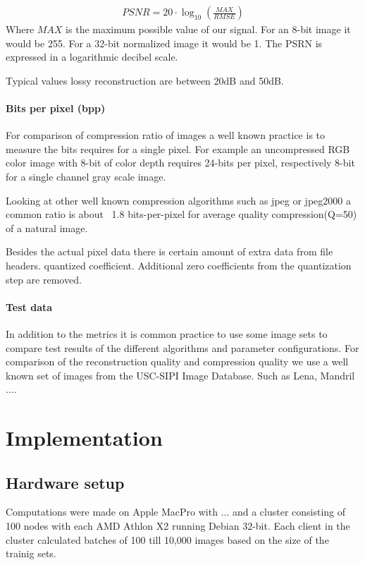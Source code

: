 
\begin{align}
 PSNR = 20 \cdot \log_{10} \left(\frac{MAX}{RMSE}\right)
\end{align}
Where $MAX$ is the maximum possible value of our signal. For an 8-bit image it
would be 255. For a 32-bit normalized image it would be 1. The PSRN is expressed
in a logarithmic decibel scale.

Typical values lossy reconstruction are between 20dB and 50dB.




\paragraph{Bits per pixel (bpp)}
For comparison of compression ratio of images a well known practice is to
measure the bits requires for a single pixel. For example an uncompressed RGB
color image with 8-bit of color depth requires 24-bits per pixel, respectively
8-bit for a single channel gray scale image.

Looking at other well known compression algorithms such as jpeg or jpeg2000
a common ratio is about ~1.8 bits-per-pixel for average quality
compression(Q=50) of a natural image. 

Besides the actual pixel data there is certain amount of extra data from file
headers. 
quantized coefficient. Additional zero coefficients from the quantization step
are removed.

\paragraph{Test data}
In addition to the metrics it is common practice to use some image sets to
compare test results of the different algorithms and parameter configurations.
For comparison of the reconstruction quality and compression quality we use a
well known set of images from the USC-SIPI Image Database. Such as Lena, Mandril
....

\section{Implementation}
%

\subsection*{Hardware setup}
Computations were made on Apple MacPro with ... 
and a cluster consisting of 100 nodes with each AMD Athlon X2  running Debian 32-bit. Each client in the cluster calculated batches of
100 till 10,000 images based on the size of the trainig sets.

